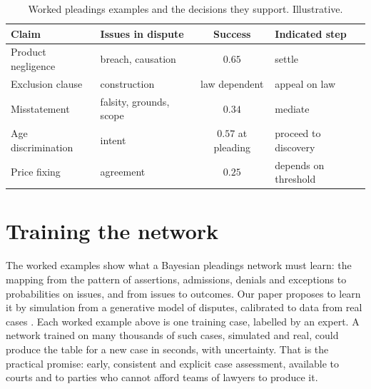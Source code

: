 \begin{table}[ht]
\centering\small
\begin{tabular}{p{2.3cm}p{2.9cm}cp{2.0cm}}
\toprule
Claim & Issues in dispute & Success & Indicated step\\
\midrule
Product negligence & breach, causation & $0.65$ & settle\\
Exclusion clause & construction & law dependent & appeal on law\\
Misstatement & falsity, grounds, scope & $0.34$ & mediate\\
Age discrimination & intent & $0.57$ at pleading & proceed to discovery\\
Price fixing & agreement & $0.25$ & depends on threshold\\
\bottomrule
\end{tabular}
\caption{Worked pleadings examples and the decisions they support. Illustrative.}
\label{tab:pleadingdecisions}
\end{table}

\section{Training the network}

The worked examples show what a Bayesian pleadings network must learn: the mapping from the pattern of assertions, admissions, denials and exceptions to probabilities on issues, and from issues to outcomes. Our paper proposes to learn it by simulation from a generative model of disputes, calibrated to data from real cases \citep{polson_sokolov_pleadings}. Each worked example above is one training case, labelled by an expert. A network trained on many thousands of such cases, simulated and real, could produce the table for a new case in seconds, with uncertainty. That is the practical promise: early, consistent and explicit case assessment, available to courts and to parties who cannot afford teams of lawyers to produce it.

